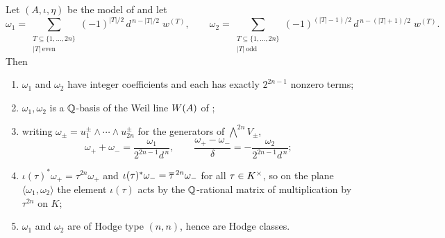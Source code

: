 \begin{theorem}\label{thm:explicitgens}
Let $(A,\iota,\eta)$ be the model of  and let
\begin{equation}\label{eq:omegagens}
  \omega_{1}=\sum_{\substack{T\subseteq\{1,\dots,2n\}\\ |T|\ \mathrm{even}}}
    (-1)^{|T|/2}\,d^{\,n-|T|/2}\;w^{(T)},
  \qquad
  \omega_{2}=\sum_{\substack{T\subseteq\{1,\dots,2n\}\\ |T|\ \mathrm{odd}}}
    (-1)^{(|T|-1)/2}\,d^{\,n-(|T|+1)/2}\;w^{(T)} .
\end{equation}
Then
\begin{enumerate}[label=\textup{(\roman*)},nosep]
\item $\omega_{1}$ and $\omega_{2}$ have integer coefficients and each has
  exactly $2^{2n-1}$ nonzero terms;
\item $\omega_{1},\omega_{2}$ is a $\mathbb{Q}$-basis of the Weil line
  $W(A)$ of ;
\item writing $\omega_{\pm}=u_{1}^{\pm}\wedge\cdots\wedge u_{2n}^{\pm}$ for the
  generators of $\bigwedge^{2n}V_{\pm}$,
  \[
    \omega_{+}+\omega_{-}=\frac{\omega_{1}}{2^{2n-1}d^{\,n}},
    \qquad
    \frac{\omega_{+}-\omega_{-}}{\delta}=-\frac{\omega_{2}}{2^{2n-1}d^{\,n}} ;
  \]
\item $\iota(\tau)^{*}\omega_{+}=\tau^{2n}\omega_{+}$ and
  $\iota(\tau)^{*}\omega_{-}=\overline{\tau}^{\,2n}\omega_{-}$ for all
  $\tau\in K^{\times}$, so on the plane $\langle\omega_{1},\omega_{2}\rangle$ the
  element $\iota(\tau)$ acts by the $\mathbb{Q}$-rational matrix of multiplication by
  $\tau^{2n}$ on $K$;
\item $\omega_{1}$ and $\omega_{2}$ are of Hodge type $(n,n)$, hence are Hodge
  classes.
\end{enumerate}
\end{theorem}

